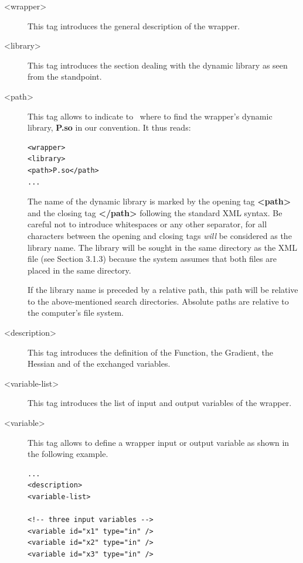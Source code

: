 \begin{description}
\item[<wrapper>] This tag introduces the general description of the wrapper.

\item[<library>] This tag introduces the section dealing with the dynamic library as seen from the \OT standpoint.

\item[<path>] This tag allows to indicate to \OT\ where to find the wrapper's dynamic library, {\bf P.so} in our convention. It thus reads:

\lstset{language=XML, basicstyle=\normalsize}
\begin{lstlisting}[frame=TBRL]
<wrapper>
<library>
<path>P.so</path>
...
\end{lstlisting}

The name of the dynamic library is marked by the opening tag {\bf <path>} and the closing tag {\bf </path>} following the standard XML syntax. Be careful not to introduce whitespaces or any other separator, for all characters between the opening and closing tags \emph{will} be considered as the library name. The library will be sought in the same directory as the XML file (see Section 3.1.3) because the system assumes that both files are placed in the same directory.

If the library name is preceded by a relative path, this path will be relative to the above-mentioned search directories. Absolute paths are relative to the computer's file system.

\item[<description>] This tag introduces the definition of the Function, the Gradient, the Hessian and of the exchanged variables.

\item[<variable-list>] This tag introduces the list of input and output variables of the wrapper.

\item[<variable>] This tag allows to define a wrapper input or output variable  as shown in the following example.

\lstset{language=XML, basicstyle=\normalsize}
\begin{lstlisting}[frame=TBRL]
...
<description>
<variable-list>

<!-- three input variables -->
<variable id="x1" type="in" />
<variable id="x2" type="in" />
<variable id="x3" type="in" />


\end{lstlisting}
\end{description}

